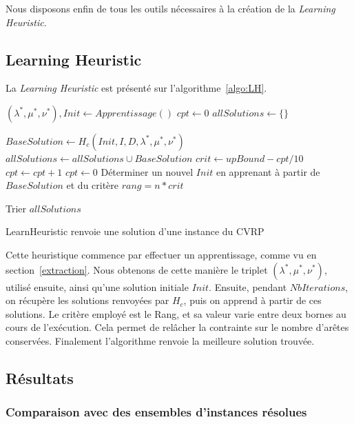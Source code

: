 \documentclass[a4paper,11pt]{article}%
\begin{document}
Nous disposons enfin de tous les outils nécessaires à la création de la \emph{Learning Heuristic}.

\subsection{Learning Heuristic}
La \emph{Learning Heuristic} est présenté sur l'algorithme~\ref{algo:LH}.

\begin{algorithm}
\DontPrintSemicolon %
$(\lambda^*,\mu^*,\nu^*), Init \gets Apprentissage()$\;
$cpt \gets 0$\;
$ allSolutions \gets \{ \}$\;
 {
	$BaseSolution \gets H_c(Init,I,D,\lambda^*,\mu^*,\nu^*)$\;
	$allSolutions \gets allSolutions \cup BaseSolution$\;
	$crit \gets upBound - cpt/10$\;
	$cpt \gets cpt + 1$\;
	 {
		$cpt \gets 0$\;
	}
	Déterminer un nouvel $Init$ en apprenant à partir de $BaseSolution$ et du critère $rang = n*crit$\;

}
Trier $allSolutions$\;

\;
\caption{{\sc LearnHeuristic} renvoie une solution d'une instance du CVRP}
\label{algo:LH}
\end{algorithm}

Cette heuristique commence par effectuer un apprentissage, comme vu en section~\ref{extraction}. Nous obtenons de cette manière le triplet $(\lambda^*,\mu^*,\nu^*)$, utilisé ensuite, ainsi qu'une solution initiale $Init$.
Ensuite, pendant $NbIterations$, on récupère les solutions renvoyées par $H_c$, puis on apprend à partir de ces solutions. Le critère employé est le Rang, et sa valeur varie entre deux bornes au cours de l'exécution. Cela permet de relâcher la contrainte sur le nombre d'arêtes conservées.
Finalement l'algorithme renvoie la meilleure solution trouvée.



\subsection{Résultats}

\subsubsection{Comparaison avec des ensembles d'instances résolues}
\end{document}

